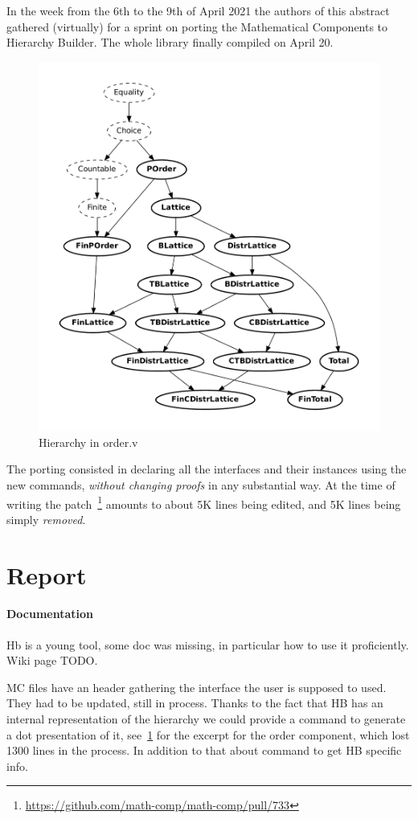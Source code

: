 \documentclass{easychair}
\begin{document}
In the week from the 6th to the 9th of April 2021 the authors of this abstract
gathered (virtually) for a sprint on porting the Mathematical Components to
Hierarchy Builder. The whole library finally compiled on April 20.

\begin{figure}
  \vspace{-3.2em}
	\includegraphics[width=.45\textwidth]{order.pdf}
  \caption{\small Hierarchy in order.v}
	\label{fig:order}
\end{figure}
The porting consisted in declaring all the interfaces and their instances
using the new commands, \emph{without changing proofs} in any substantial way.
At the time of writing the patch~\footnote{\url{https://github.com/math-comp/math-comp/pull/733}}
amounts to about 5K lines being edited, and 5K lines being simply \emph{removed}.\\

\section{Report}

\paragraph{Documentation}

Hb is a young tool, some doc was missing, in particular how to use it
proficiently. Wiki page TODO.

MC files have an header gathering the interface the user is supposed to used.
They had to be updated, still in process. Thanks to the fact that HB has an
internal representation of the hierarchy we could provide a command to
generate a dot presentation of it, see~\ref{fig:order} for the excerpt for the
order component, which lost 1300 lines in the process. In addition to that about command to get HB
specific info.
\end{document}
